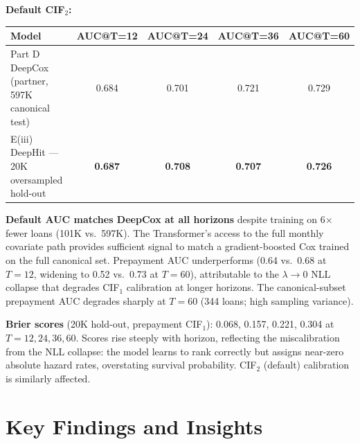 \documentclass[11pt,a4paper]{article}
\begin{document}
\textbf{Default CIF$_2$:}
\begin{center}
\small
\begin{tabular}{lcccc}
\toprule
\textbf{Model} & \textbf{AUC@T=12} & \textbf{AUC@T=24} & \textbf{AUC@T=36} & \textbf{AUC@T=60} \\
\midrule
Part D DeepCox (partner, 597K canonical test) & 0.684 & 0.701 & 0.721 & 0.729 \\
E(iii) DeepHit --- 20K oversampled hold-out   & \textbf{0.687} & \textbf{0.708} & \textbf{0.707} & \textbf{0.726} \\
\bottomrule
\end{tabular}
\end{center}

\textbf{Default AUC matches DeepCox at all horizons} despite training on 6$\times$ fewer loans
(101K vs.\ 597K).  The Transformer's access to the full monthly covariate path provides
sufficient signal to match a gradient-boosted Cox trained on the full canonical set.
Prepayment AUC underperforms (0.64 vs.\ 0.68 at $T=12$, widening to 0.52 vs.\ 0.73 at $T=60$),
attributable to the $\lambda\!\to\!0$ NLL collapse that degrades CIF$_1$ calibration at
longer horizons. The canonical-subset prepayment AUC degrades sharply at $T=60$ (344 loans;
high sampling variance).

\textbf{Brier scores} (20K hold-out, prepayment CIF$_1$): 0.068, 0.157, 0.221, 0.304 at $T= 12, 24, 36, 60$.
Scores rise steeply with horizon, reflecting the miscalibration from the NLL collapse:
the model learns to rank correctly but assigns near-zero absolute hazard rates,
overstating survival probability. CIF$_2$ (default) calibration is similarly affected.

\section{Key Findings and Insights}
\end{document}
